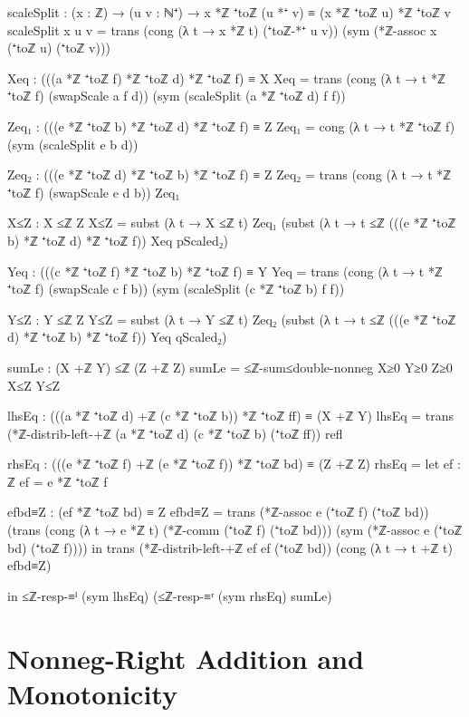 \documentclass[11pt,a4paper]{book}
\begin{document}
\begin{code}
    scaleSplit : (x : ℤ) → (u v : ℕ⁺) → x *ℤ ⁺toℤ (u *⁺ v) ≡ (x *ℤ ⁺toℤ u) *ℤ ⁺toℤ v
    scaleSplit x u v =
      trans
        (cong (λ t → x *ℤ t) (⁺toℤ-*⁺ u v))
        (sym (*ℤ-assoc x (⁺toℤ u) (⁺toℤ v)))

    Xeq : (((a *ℤ ⁺toℤ f) *ℤ ⁺toℤ d) *ℤ ⁺toℤ f) ≡ X
    Xeq =
      trans
        (cong (λ t → t *ℤ ⁺toℤ f) (swapScale a f d))
        (sym (scaleSplit (a *ℤ ⁺toℤ d) f f))

    Zeq₁ : (((e *ℤ ⁺toℤ b) *ℤ ⁺toℤ d) *ℤ ⁺toℤ f) ≡ Z
    Zeq₁ =
      cong (λ t → t *ℤ ⁺toℤ f) (sym (scaleSplit e b d))

    Zeq₂ : (((e *ℤ ⁺toℤ d) *ℤ ⁺toℤ b) *ℤ ⁺toℤ f) ≡ Z
    Zeq₂ =
      trans
        (cong (λ t → t *ℤ ⁺toℤ f) (swapScale e d b))
        Zeq₁

    X≤Z : X ≤ℤ Z
    X≤Z =
      subst (λ t → X ≤ℤ t) Zeq₁
        (subst (λ t → t ≤ℤ (((e *ℤ ⁺toℤ b) *ℤ ⁺toℤ d) *ℤ ⁺toℤ f))
          Xeq
          pScaled₂)

    Yeq : (((c *ℤ ⁺toℤ f) *ℤ ⁺toℤ b) *ℤ ⁺toℤ f) ≡ Y
    Yeq =
      trans
        (cong (λ t → t *ℤ ⁺toℤ f) (swapScale c f b))
        (sym (scaleSplit (c *ℤ ⁺toℤ b) f f))

    Y≤Z : Y ≤ℤ Z
    Y≤Z =
      subst (λ t → Y ≤ℤ t) Zeq₂
        (subst (λ t → t ≤ℤ (((e *ℤ ⁺toℤ d) *ℤ ⁺toℤ b) *ℤ ⁺toℤ f))
          Yeq
          qScaled₂)

    sumLe : (X +ℤ Y) ≤ℤ (Z +ℤ Z)
    sumLe = ≤ℤ-sum≤double-nonneg X≥0 Y≥0 Z≥0 X≤Z Y≤Z

    lhsEq : (((a *ℤ ⁺toℤ d) +ℤ (c *ℤ ⁺toℤ b)) *ℤ ⁺toℤ ff) ≡ (X +ℤ Y)
    lhsEq =
      trans
        (*ℤ-distrib-left-+ℤ (a *ℤ ⁺toℤ d) (c *ℤ ⁺toℤ b) (⁺toℤ ff))
        refl

    rhsEq : (((e *ℤ ⁺toℤ f) +ℤ (e *ℤ ⁺toℤ f)) *ℤ ⁺toℤ bd) ≡ (Z +ℤ Z)
    rhsEq =
      let
        ef : ℤ
        ef = e *ℤ ⁺toℤ f

        efbd≡Z : (ef *ℤ ⁺toℤ bd) ≡ Z
        efbd≡Z =
          trans
            (*ℤ-assoc e (⁺toℤ f) (⁺toℤ bd))
            (trans
              (cong (λ t → e *ℤ t) (*ℤ-comm (⁺toℤ f) (⁺toℤ bd)))
              (sym (*ℤ-assoc e (⁺toℤ bd) (⁺toℤ f))))
      in
      trans
        (*ℤ-distrib-left-+ℤ ef ef (⁺toℤ bd))
        (cong (λ t → t +ℤ t) efbd≡Z)

  in
  ≤ℤ-resp-≡ˡ (sym lhsEq) (≤ℤ-resp-≡ʳ (sym rhsEq) sumLe)
\end{code}

\section{Nonneg-Right Addition and Monotonicity}
\end{document}
